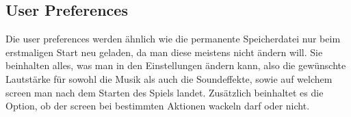 \subsection{User Preferences}\label{subsec:user-prefs}
Die user preferences werden ähnlich wie die permanente Speicherdatei nur beim erstmaligen Start neu geladen, da man diese meistens nicht ändern will.
Sie beinhalten alles, was man in den Einstellungen ändern kann, also die gewünschte Lautstärke für sowohl die Musik als auch die Soundeffekte, sowie auf welchem screen man nach dem Starten des Spiels landet.
Zusätzlich beinhaltet es die Option, ob der screen bei bestimmten Aktionen wackeln darf oder nicht.